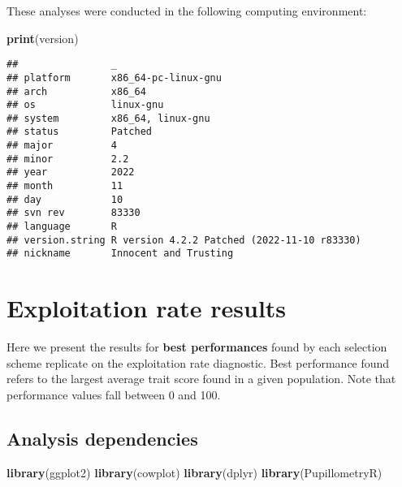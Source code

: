 \documentclass[]{book}
\newenvironment{Shaded}{\begin{snugshade}}{\end{snugshade}}
\newcommand{\KeywordTok}[1]{\textcolor[rgb]{0.13,0.29,0.53}{\textbf{#1}}}
\newcommand{\NormalTok}[1]{#1}
\begin{document}
These analyses were conducted in the following computing environment:

\begin{Shaded}
\begin{Highlighting}[]
\KeywordTok{print}\NormalTok{(version)}
\end{Highlighting}
\end{Shaded}

\begin{verbatim}
##                _                                          
## platform       x86_64-pc-linux-gnu                        
## arch           x86_64                                     
## os             linux-gnu                                  
## system         x86_64, linux-gnu                          
## status         Patched                                    
## major          4                                          
## minor          2.2                                        
## year           2022                                       
## month          11                                         
## day            10                                         
## svn rev        83330                                      
## language       R                                          
## version.string R version 4.2.2 Patched (2022-11-10 r83330)
## nickname       Innocent and Trusting
\end{verbatim}

\hypertarget{exploitation-rate-results}{%
\chapter{Exploitation rate results}\label{exploitation-rate-results}}

Here we present the results for \textbf{best performances} found by each selection scheme replicate on the exploitation rate diagnostic.
Best performance found refers to the largest average trait score found in a given population.
Note that performance values fall between 0 and 100.

\hypertarget{analysis-dependencies}{%
\section{Analysis dependencies}\label{analysis-dependencies}}

\begin{Shaded}
\begin{Highlighting}[]
\KeywordTok{library}\NormalTok{(ggplot2)}
\KeywordTok{library}\NormalTok{(cowplot)}
\KeywordTok{library}\NormalTok{(dplyr)}
\KeywordTok{library}\NormalTok{(PupillometryR)}
\end{Highlighting}
\end{Shaded}
\end{document}
